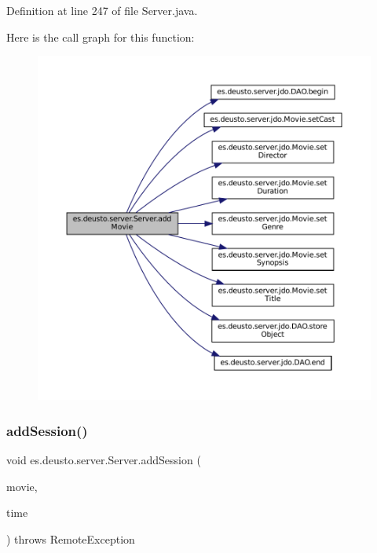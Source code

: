 Definition at line 247 of file Server.\+java.

Here is the call graph for this function\+:
\nopagebreak
\begin{figure}[H]
\begin{center}
\leavevmode
\includegraphics[width=350pt]{classes_1_1deusto_1_1server_1_1_server_ac5b894308dff2d0d47b7c665f190603c_cgraph}
\end{center}
\end{figure}
\mbox{\label{classes_1_1deusto_1_1server_1_1_server_a465a6299e03ec7d69ed238cb96292e9c}} 
\subsubsection{\texorpdfstring{addSession()}{addSession()}}
{\footnotesize\ttfamily void es.\+deusto.\+server.\+Server.\+add\+Session (\begin{DoxyParamCaption}\item[{\mbox{\hyperlink{classes_1_1deusto_1_1server_1_1data_1_1_movie_d_t_o}{Movie\+D\+TO}}}]{movie,  }\item[{Date}]{time }\end{DoxyParamCaption}) throws Remote\+Exception}



